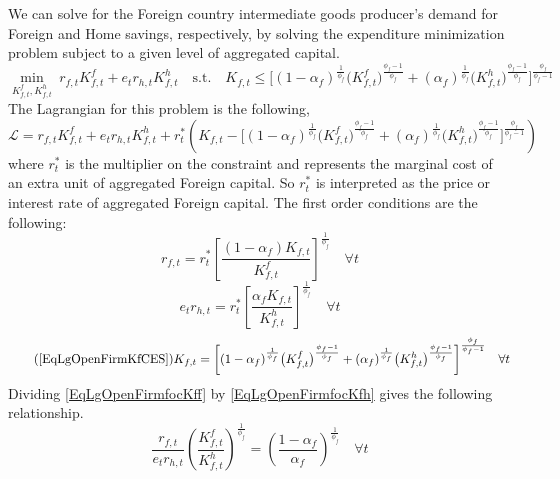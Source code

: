     We can solve for the Foreign country intermediate goods producer's demand for Foreign and Home savings, respectively, by solving the expenditure minimization problem subject to a given level of aggregated capital.
    \begin{equation}\label{EqLgOpenFirmMinProbF}
      \min_{K^f_{f,t},K^h_{f,t}} \: r_{f,t} K^f_{f,t} + e_t r_{h,t}K^h_{f,t} \quad \text{s.t.} \quad K_{f,t} \leq \biggl[(1 - \alpha_f)^\frac{1}{\phi_f}\bigl(K^f_{f,t}\bigr)^\frac{\phi_f-1}{\phi_f} + (\alpha_f)^\frac{1}{\phi_f}\bigl(K^h_{f,t}\bigr)^\frac{\phi_f-1}{\phi_f}\biggr]^\frac{\phi_f}{\phi_f-1}
    \end{equation}
    The Lagrangian for this problem is the following,
    \begin{equation}\label{EqLgOpenFirmlagrF}
      \mathcal{L} = r_{f,t}K^f_{f,t} + e_t r_{h,t}K^h_{f,t} + r^*_t\left(K_{f,t} - \biggl[(1 - \alpha_f)^\frac{1}{\phi_f}\bigl(K^f_{f,t}\bigr)^\frac{\phi_f-1}{\phi_f} + (\alpha_f)^\frac{1}{\phi_f}\bigl(K^h_{f,t}\bigr)^\frac{\phi_f-1}{\phi_f}\biggr]^\frac{\phi_f}{\phi_f-1}\right)
    \end{equation}
    where $r^*_t$ is the multiplier on the constraint and represents the marginal cost of an extra unit of aggregated Foreign capital. So $r^*_t$ is interpreted as the price or interest rate of aggregated Foreign capital. The first order conditions are the following:
    \begin{equation}\label{EqLgOpenFirmfocKff}
      r_{f,t} = r^*_t\left[\frac{(1-\alpha_f)K_{f,t}}{K^f_{f,t}}\right]^{\frac{1}{\phi_f}} \quad\forall t
    \end{equation}
    \begin{equation}\label{EqLgOpenFirmfocKfh}
      e_t r_{h,t} = r^*_t\left[\frac{\alpha_f K_{f,t}}{K^h_{f,t}}\right]^{\frac{1}{\phi_f}} \quad\forall t
    \end{equation}
    \begin{equation}\tag{\ref{EqLgOpenFirmKfCES}}
      K_{f,t}= \biggl[(1 - \alpha_f)^\frac{1}{\phi_f}\bigl(K^f_{f,t}\bigr)^\frac{\phi_f-1}{\phi_f} + (\alpha_f)^\frac{1}{\phi_f}\bigl(K^h_{f,t}\bigr)^\frac{\phi_f-1}{\phi_f}\biggr]^\frac{\phi_f}{\phi_f-1} \quad\forall t
    \end{equation}
    Dividing \eqref{EqLgOpenFirmfocKff} by \eqref{EqLgOpenFirmfocKfh} gives the following relationship.
    \begin{equation}\label{EqLgOpenFirmFracCapForDom}
      \frac{r_{f,t}}{e_t r_{h,t}}\left(\frac{K^f_{f,t}}{K^h_{f,t}}\right)^{\frac{1}{\phi_f}} = \left(\frac{1-\alpha_f}{\alpha_f}\right)^{\frac{1}{\phi_f}} \quad\forall t
    \end{equation}

